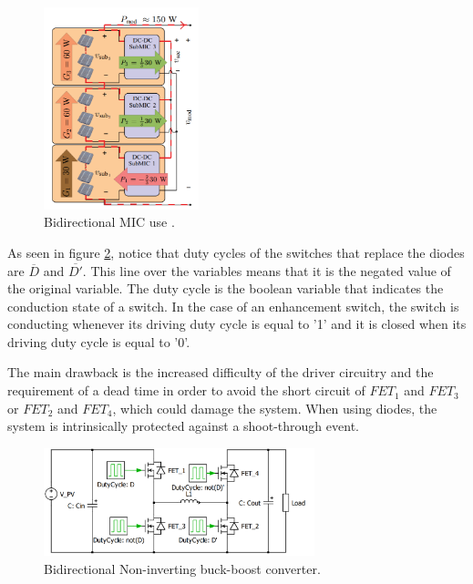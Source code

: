 \begin{figure}[htbp]
	\begin{center}
		\includegraphics[width=0.4\textwidth]{../Pictures/bidirectional_mic_use}
		\caption{Bidirectional MIC use \cite{ArchitectureMIC}.}
		\label{BID_MIC_ARCHITECTURES}
	\end{center}	
\end{figure}
		
		
As seen in figure \ref{BID_N_INV_BB_SCHEMATIC}, notice that duty cycles of the switches that replace the diodes are $\overline{D}$ and $\overline{D'}$. This line over the variables means that it is the negated value of the original variable. The duty cycle is the boolean variable that indicates the conduction state of a switch. In the case of an enhancement switch, the switch is conducting whenever its driving duty cycle is equal to '1' and it is closed when its driving duty cycle is equal to '0'. 
		
The main drawback is the increased difficulty of the driver circuitry and the requirement of a dead time in order to avoid the short circuit of $FET_1$ and $FET_3$ or $FET_2$ and $FET_4$, which could damage the system. When using diodes, the system is intrinsically protected against a shoot-through event. 	
		
\begin{figure}[htbp]
	\begin{center}
	\includegraphics[width=0.7\textwidth]{../Pictures/BID_H_B_BB}
	\caption{Bidirectional Non-inverting buck-boost converter.}
	\label{BID_N_INV_BB_SCHEMATIC}
	\end{center}
\end{figure}



